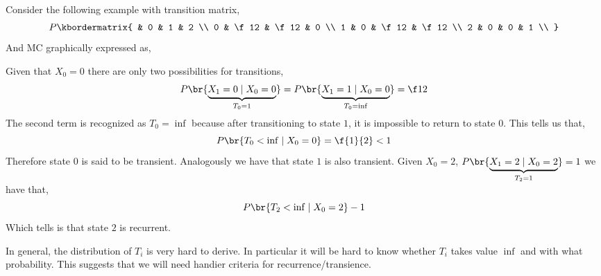 \documentclass{article}
\begin{document}
\begin{example}
    Consider the following example with transition matrix,
    \[ P \kbordermatrix{
          & 0 & 1 & 2 \\
        0 & \f12 & \f12 & 0 \\
        1 & 0 & \f12 & \f12 \\
        2 & 0 & 0 & 1 \\
    } \]
    And MC graphically expressed as,
    \begin{center}
    \end{center}
    Given that $X_0 = 0$ there are only two possibilities for transitions,
    \[ P\br{\underbrace{X_1 = 0 \mid X_0 = 0}_{T_0 = 1}} = P\br{\underbrace{X_1 = 1 \mid X_0 = 0}_{T_0 = \inf}} = \f12 \]
    The second term is recognized as $T_0 = \inf$ because after transitioning to state $1$, it is impossible to return to state $0$. This tells us that,
    \[ P\br{T_0 < \inf \mid X_0 = 0} = \f{1}{2} < 1 \]
    Therefore state $0$ is said to be transient. Analogously we have that state $1$ is also transient. Given $X_0 = 2$, $P\br{\underbrace{X_1 = 2 \mid X_0 = 2}_{T_2=1}} = 1$ we have that,
    \[ P\br{T_2 < \inf \mid X_0 = 2} - 1 \]
    Which tells is that state $2$ is recurrent.
\end{example}
In general, the distribution of $T_i$ is very hard to derive. In particular it will be hard to know whether $T_i$ takes value $\inf$ and with what probability. This suggests that we will need handier criteria for recurrence/transience. \\
\end{document}
